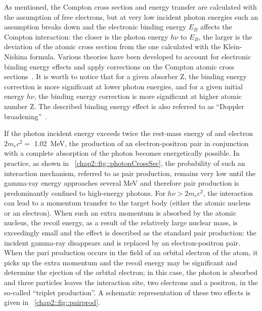 As mentioned, the Compton cross section and energy transfer are calculated with the assumption of free electrons, but at very low incident photon energies such an assumption breaks down and the electronic binding energy $E_B$ affects the Compton interaction: the closer is the photon energy $h\nu$ to $E_B$, the larger is the deviation of the atomic cross section from the one calculated with the Klein-Nishina formula. Various theories have been developed to account for electronic binding energy effects and apply corrections on the Compton atomic cross sections~\parencite{Bergstrom1997}. It is worth to notice that for a given absorber Z, the binding energy correction is more significant at lower photon energies, and for a given initial energy $h\nu$, the binding energy correction is more significant at higher atomic number Z. The described binding energy effect is also referred to as \enquote{Doppler broadening}~\parencite{DuMond1928, DuMond1929}. 
   
If the photon incident energy exceeds twice the rest-mass energy of and electron  $2m_ec^2 = $ 1.02~MeV, the production of an electron-positron pair in conjunction with a complete absorption of the photon becomes energetically possible. In practice, as shown in \figurename~\ref{chap2::fig::photonCrossSec}, the probability of such an interaction mechanism, referred to as pair production, remains very low until the gamma-ray energy approaches several MeV and therefore pair production is predominantly confined to high-energy photons. For $h\nu > 2m_ec^2$, the interaction can lead to a momentum transfer to the target body (either the atomic nucleus or an electron). When such an extra momentum is absorbed by the atomic nucleus, the recoil energy, as a result of the relatively large nuclear mass, is exceedingly small and the effect is described as the standard pair production: the incident gamma-ray disappears and is replaced by an electron-positron pair. When the pari production occurs in the field of an orbital electron of the atom, it picks up the extra momentum and the recoil energy may be significant and determine the ejection of the orbital electron; in this case, the photon is absorbed and three particles leaves the interaction site, two electrons and a positron, in the so-called \enquote{triplet production}. A schematic representation of these two effects is given in \figurename~\ref{chap2::fig::pairprod}.


